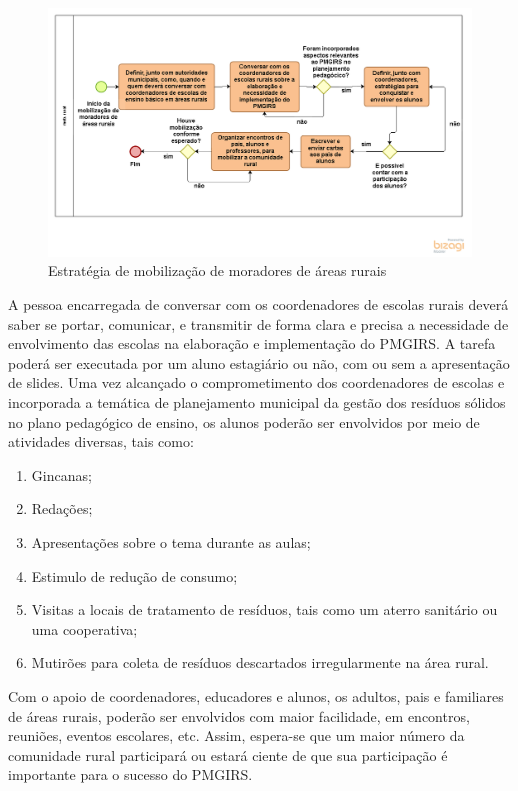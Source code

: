 \begin{figure}[h!]
	\centering
	\includegraphics[width=\linewidth]{produtos/produm/estrategmobiarearural}
	\caption{Estratégia de mobilização de moradores de áreas rurais}
	\label{fig:estrategmobiarearural}
\end{figure}

A pessoa encarregada de conversar com os coordenadores de escolas rurais deverá saber se portar, comunicar, e transmitir de forma clara e precisa a necessidade de envolvimento das escolas na elaboração e implementação do PMGIRS. A tarefa poderá ser executada por um aluno estagiário ou não, com ou sem a apresentação de slides. Uma vez alcançado o comprometimento dos coordenadores de escolas e incorporada a temática de planejamento municipal da gestão dos resíduos sólidos no plano pedagógico de ensino, os alunos poderão ser envolvidos por meio de atividades diversas, tais como:
\begin{enumerate}
	\item Gincanas; 
	\item Redações; 
	\item Apresentações sobre o tema durante as aulas; 
	\item Estimulo de redução de consumo; 
	\item Visitas a locais de tratamento de resíduos, tais como um aterro sanitário ou uma cooperativa; 
	\item Mutirões para coleta de resíduos descartados irregularmente na área rural. 
\end{enumerate}

Com o apoio de coordenadores, educadores e alunos, os adultos, pais e familiares de áreas rurais, poderão ser envolvidos com maior facilidade, em encontros, reuniões, eventos escolares, etc. Assim, espera-se que um maior número da comunidade rural participará ou estará ciente de que sua participação é importante para o sucesso do PMGIRS.

